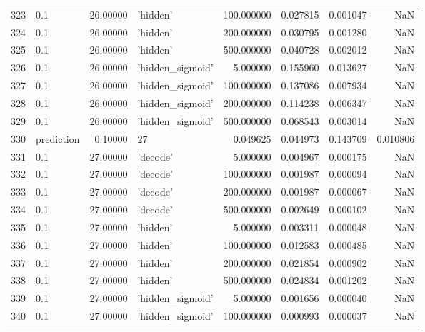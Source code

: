 \documentclass[10pt,a4paper]{article}
\begin{document}
\begin{tabular}{llrlrrrr}
323  &         0.1 &  26.00000 &           'hidden' &  100.000000 &  0.027815 &  0.001047 &       NaN \\
324  &         0.1 &  26.00000 &           'hidden' &  200.000000 &  0.030795 &  0.001280 &       NaN \\
325  &         0.1 &  26.00000 &           'hidden' &  500.000000 &  0.040728 &  0.002012 &       NaN \\
326  &         0.1 &  26.00000 &   'hidden\_sigmoid' &    5.000000 &  0.155960 &  0.013627 &       NaN \\
327  &         0.1 &  26.00000 &   'hidden\_sigmoid' &  100.000000 &  0.137086 &  0.007934 &       NaN \\
328  &         0.1 &  26.00000 &   'hidden\_sigmoid' &  200.000000 &  0.114238 &  0.006347 &       NaN \\
329  &         0.1 &  26.00000 &   'hidden\_sigmoid' &  500.000000 &  0.068543 &  0.003014 &       NaN \\
330  &  prediction &   0.10000 &                 27 &    0.049625 &  0.044973 &  0.143709 &  0.010806 \\
331  &         0.1 &  27.00000 &           'decode' &    5.000000 &  0.004967 &  0.000175 &       NaN \\
332  &         0.1 &  27.00000 &           'decode' &  100.000000 &  0.001987 &  0.000094 &       NaN \\
333  &         0.1 &  27.00000 &           'decode' &  200.000000 &  0.001987 &  0.000067 &       NaN \\
334  &         0.1 &  27.00000 &           'decode' &  500.000000 &  0.002649 &  0.000102 &       NaN \\
335  &         0.1 &  27.00000 &           'hidden' &    5.000000 &  0.003311 &  0.000048 &       NaN \\
336  &         0.1 &  27.00000 &           'hidden' &  100.000000 &  0.012583 &  0.000485 &       NaN \\
337  &         0.1 &  27.00000 &           'hidden' &  200.000000 &  0.021854 &  0.000902 &       NaN \\
338  &         0.1 &  27.00000 &           'hidden' &  500.000000 &  0.024834 &  0.001202 &       NaN \\
339  &         0.1 &  27.00000 &   'hidden\_sigmoid' &    5.000000 &  0.001656 &  0.000040 &       NaN \\
340  &         0.1 &  27.00000 &   'hidden\_sigmoid' &  100.000000 &  0.000993 &  0.000037 &       NaN \\

\end{tabular}
\end{document}
